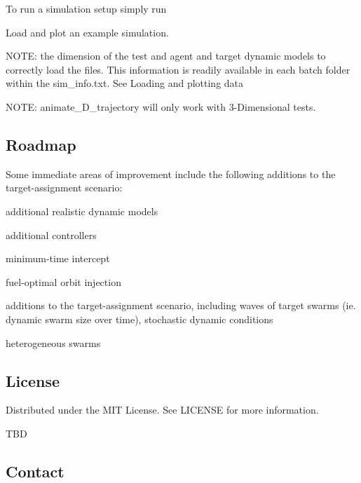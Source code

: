 To run a simulation setup simply run 
\begin{DoxyCode}{0}
\end{DoxyCode}


Load and plot an example simulation. 
\begin{DoxyCode}{0}
\end{DoxyCode}


N\+O\+TE\+: the dimension of the test and agent and target dynamic models to correctly load the files. This information is readily available in each batch folder within the sim\+\_\+info.\+txt. See \textquotesingle{}Loading and plotting data\textquotesingle{}

N\+O\+TE\+: animate\+\_\+D\+\_\+trajectory will only work with 3-\/Dimensional tests.

\subsection*{Roadmap}

Some immediate areas of improvement include the following additions to the target-\/assignment scenario\+:
\begin{DoxyItemize}
\item additional realistic dynamic models
\item additional controllers
\begin{DoxyItemize}
\item minimum-\/time intercept
\item fuel-\/optimal orbit injection
\end{DoxyItemize}
\item additions to the target-\/assignment scenario, including waves of target swarms (ie. dynamic swarm size over time), stochastic dynamic conditions
\item heterogeneous swarms
\end{DoxyItemize}

\subsection*{License}

Distributed under the M\+IT License. See {\ttfamily L\+I\+C\+E\+N\+SE} for more information.

T\+BD

\subsection*{Contact}


